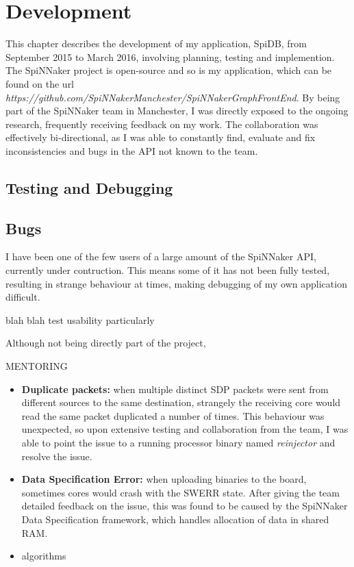 \chapter{Development}

This chapter describes the development of my application, SpiDB, from September 2015 to March 2016, involving planning, testing and implemention. The SpiNNaker project is open-source and so is my application, which can be found on the url \textit{https://github.com/SpiNNakerManchester/SpiNNakerGraphFrontEnd}.
By being part of the SpiNNaker team in Manchester, I was directly exposed to the ongoing research, frequently receiving feedback on my work. The collaboration was effectively bi-directional, as I was able to constantly find, evaluate and fix inconsistencies and bugs in the API not known to the team.

\section{Testing and Debugging}

\section{Bugs}
I have been one of the few users of a large amount of the SpiNNaker API, currently under contruction. This means some of it has not been fully tested, resulting in strange behaviour at times, making debugging of my own application difficult.

blah blah test usability
particularly

Although not being directly part of the project, 

MENTORING

\begin{itemize}
\item \textbf{Duplicate packets:} when multiple distinct SDP packets were sent from different sources to the same destination, strangely the receiving core would read the same packet duplicated a number of times. This behaviour was unexpected, so upon extensive testing and collaboration from the team, I was able to point the issue to a running processor binary named \textit{reinjector} and resolve the issue. 

\item \textbf{Data Specification Error:} when uploading binaries to the board, sometimes cores would crash with the SWERR state. After giving the team detailed feedback on the issue, this was found to be caused by the SpiNNaker Data Specification framework, which handles allocation of data in shared RAM.

\item algorithms

\end{itemize}

